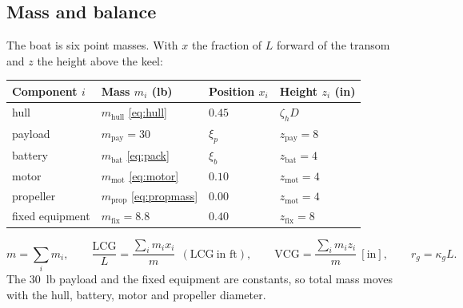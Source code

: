 \documentclass[11pt,a4paper]{article}
\renewcommand{\_}{\textunderscore\allowbreak}
\newcommand{\lcg}{\mathrm{LCG}}
\newcommand{\vcg}{\mathrm{VCG}}
\begin{document}
\subsection{Mass and balance}
The boat is six point masses. With $x$ the fraction of $L$ forward of the transom and $z$ the height above the keel:

\begin{center}\small
\begin{tabular}{@{}l l l l@{}}
\toprule
Component $i$ & Mass $m_i$ (lb) & Position $x_i$ & Height $z_i$ (in)\\
\midrule
hull    & $m_{\mathrm{hull}}$ \eqref{eq:hull} & $0.45$   & $\zeta_h D$ \\
payload & $m_{\mathrm{pay}}=30$               & $\xi_p$  & $z_{\mathrm{pay}}=8$ \\
battery & $m_{\mathrm{bat}}$ \eqref{eq:pack}  & $\xi_b$  & $z_{\mathrm{bat}}=4$ \\
motor   & $m_{\mathrm{mot}}$ \eqref{eq:motor} & $0.10$   & $z_{\mathrm{mot}}=4$ \\
propeller & $m_{\mathrm{prop}}$ \eqref{eq:propmass} & $0.00$   & $z_{\mathrm{mot}}=4$ \\
fixed equipment & $m_{\mathrm{fix}}=8.8$      & $0.40$   & $z_{\mathrm{fix}}=8$ \\
\bottomrule
\end{tabular}
\end{center}
\begin{equation}
  m = \sum_i m_i, \qquad
  \frac{\lcg}{L} = \frac{\sum_i m_i x_i}{m}\ \ (\lcg\ \text{in ft}), \qquad
  \vcg = \frac{\sum_i m_i z_i}{m}\ [\mathrm{in}], \qquad
  r_g = \kappa_g L.
  \label{eq:balance}
\end{equation}
The 30~lb payload and the fixed equipment are constants, so total mass moves with the hull, battery, motor and propeller diameter.
\end{document}
